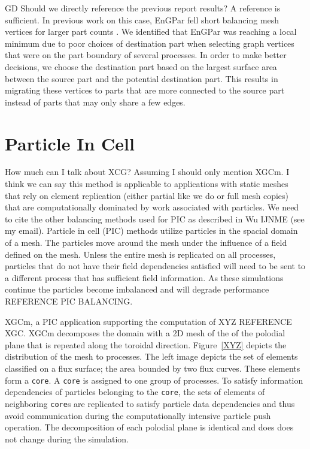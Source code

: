 \documentclass[conference]{IEEEtran}
\begin{document}
{\color{red} GD Should we directly reference the previous report results? A reference is sufficient.}
In previous work on this case, EnGPar fell short balancing mesh vertices for larger part counts
\cite{engparSC17}.
We identified that EnGPar was reaching a local minimum due to poor choices of destination part
when selecting graph vertices that were on the part boundary of several processes. In order
to make better decisions, we choose the destination part based on the largest surface area
between the source part and the potential destination part. This results in migrating these
vertices to parts that are more connected to the source part instead of parts that may only
share a few edges.

\section{Particle In Cell}


{\color{red} How much can I talk about XCG? Assuming I should only mention XGCm.
I think we can say this method is applicable to applications with static meshes
that rely on element replication (either partial like we do or full mesh copies)
that are computationally dominated by work associated with particles.  We need
to cite the other balancing methods used for PIC as described in Wu IJNME (see
my email).}
Particle in cell (PIC) methods utilize particles in the spacial domain of a
mesh.
The particles move around the mesh under the influence of a field defined on the
mesh.
Unless the entire mesh is replicated on all processes, particles that do not
have their field dependencies satisfied will need to be
sent to a different process that has sufficient field information.
As these simulations continue the particles become imbalanced and will degrade
performance{\color{red} REFERENCE PIC BALANCING}.

XGCm, a PIC application supporting the computation of XYZ {\color{red} REFERENCE
XGC}.
XGCm decomposes the domain with a 2D mesh of the
of the polodial plane that is repeated along the toroidal direction.
Figure~\ref{XYZ} depicts the distribution of the mesh to processes.
The left image depicts the set of elements classified on a flux surface; the
area bounded by two flux curves.
These elements form a \texttt{core}.
A \texttt{core} is assigned to one group of processes.
To satisfy information dependencies of particles belonging to the \texttt{core},
the sets of elements of neighboring \texttt{core}s are replicated to satisfy
particle data dependencies and thus avoid communication during the
computationally intensive particle push operation.
The decomposition of each polodial plane is identical and does does not change
during the simulation.
\end{document}
